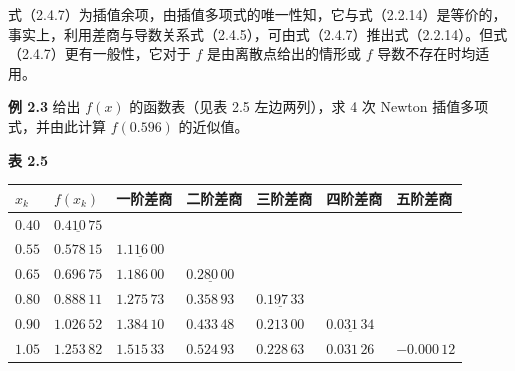 式（2.4.7）为插值余项，由插值多项式的唯一性知，它与式（2.2.14）是等价的，事实上，利用差商与导数关系式（2.4.5），可由式（2.4.7）推出式（2.2.14）。但式（2.4.7）更有一般性，它对于 \(f\) 是由离散点给出的情形或 \(f\) 导数不存在时均适用。

\textbf{例 2.3} 给出 \(f(x)\) 的函数表（见表 2.5 左边两列），求 4 次 Newton 插值多项式，并由此计算 \(f(0.596)\) 的近似值。

\textbf{表 2.5}

{\def\LTcaptype{none} %
\begin{longtable}[]{@{}
  >{\raggedright\arraybackslash}p{}
  >{\raggedright\arraybackslash}p{}
  >{\raggedright\arraybackslash}p{}
  >{\raggedright\arraybackslash}p{}
  >{\raggedright\arraybackslash}p{}
  >{\raggedright\arraybackslash}p{}
  >{\raggedright\arraybackslash}p{}@{}}
\toprule\noalign{}
\begin{minipage}[b]{\linewidth}\raggedright
\(x_k\)
\end{minipage} & \begin{minipage}[b]{\linewidth}\raggedright
\(f(x_k)\)
\end{minipage} & \begin{minipage}[b]{\linewidth}\raggedright
一阶差商
\end{minipage} & \begin{minipage}[b]{\linewidth}\raggedright
二阶差商
\end{minipage} & \begin{minipage}[b]{\linewidth}\raggedright
三阶差商
\end{minipage} & \begin{minipage}[b]{\linewidth}\raggedright
四阶差商
\end{minipage} & \begin{minipage}[b]{\linewidth}\raggedright
五阶差商
\end{minipage} \\
\midrule\noalign{}
\endhead
\bottomrule\noalign{}
\endlastfoot
\(0.40\) & \(\underline{0.410\,75}\) & & & & & \\
\(0.55\) & \(0.578\,15\) & \(\underline{1.116\,00}\) & & & & \\
\(0.65\) & \(0.696\,75\) & \(1.186\,00\) & \(\underline{0.280\,00}\) & & & \\
\(0.80\) & \(0.888\,11\) & \(1.275\,73\) & \(0.358\,93\) & \(\underline{0.197\,33}\) & & \\
\(0.90\) & \(1.026\,52\) & \(1.384\,10\) & \(0.433\,48\) & \(0.213\,00\) & \(\underline{0.031\,34}\) & \\
\(1.05\) & \(1.253\,82\) & \(1.515\,33\) & \(0.524\,93\) & \(0.228\,63\) & \(0.031\,26\) & \(-0.000\,12\) \\
\end{longtable}
}

